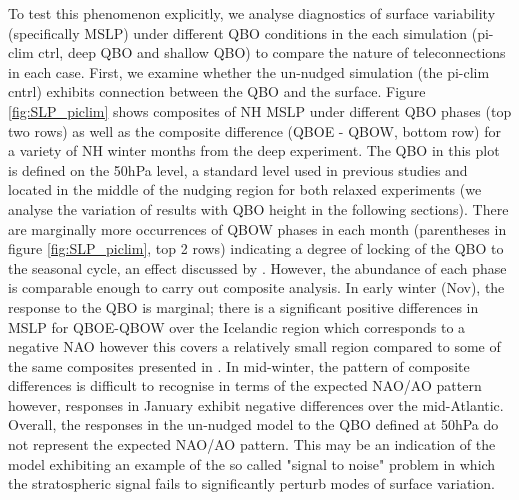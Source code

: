 To test this phenomenon explicitly, we analyse  diagnostics of surface variability (specifically MSLP) under different QBO conditions in the each simulation (pi-clim ctrl, deep QBO and shallow QBO) to compare the nature of teleconnections in each case. First, we examine whether the un-nudged simulation (the pi-clim cntrl) exhibits connection between the QBO and the surface. Figure \ref{fig:SLP_piclim} shows composites of NH MSLP under different QBO phases (top two rows) as well as the composite difference (QBOE - QBOW, bottom row) for a variety of NH winter months from the deep experiment. The QBO in this plot is defined on the 50hPa level, a standard level used in previous studies \citep{ansteyHighlatitude2014b} and located in the middle of the nudging region for both relaxed experiments (we analyse the variation of results with QBO height in the following sections). There are marginally more occurrences of QBOW phases in each month (parentheses in figure \ref{fig:SLP_piclim}, top 2 rows) indicating a degree of locking of the QBO to the seasonal cycle, an effect discussed by \citep{rajendranSynchronisation2016b}. However, the abundance of each phase is comparable enough to carry out composite analysis. In early winter (Nov), the response to the QBO is marginal; there is a significant positive differences in MSLP for QBOE-QBOW over the Icelandic region which corresponds to a negative NAO however this covers a relatively small region compared to some of the same composites presented in \cite{andrewsObserved2019d}. In mid-winter, the pattern of composite differences is difficult to recognise in terms of the expected NAO/AO pattern however, responses in January exhibit negative differences over the mid-Atlantic. Overall, the responses in the un-nudged model to the QBO defined at 50hPa do not represent the expected NAO/AO pattern. This may be an indication of the model exhibiting an example of the so called "signal to noise" problem \citep{scaifeSignaltonoise2018b} in which the stratospheric signal fails to significantly perturb modes of surface variation. 

